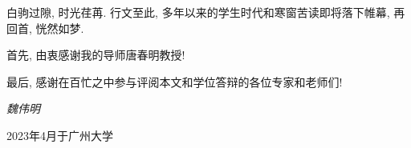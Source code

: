 \begin{thanks}
白驹过隙, 时光荏苒. 行文至此, 多年以来的学生时代和寒窗苦读即将落下帷幕, 再回首, 恍然如梦. 

首先, 由衷感谢我的导师唐春明教授! 

最后, 感谢在百忙之中参与评阅本文和学位答辩的各位专家和老师们! 


\vskip 6pt
\hspace{10.5cm} \textit{魏伟明}

\vskip 6pt
\hspace{9.0cm} 2023年4月于广州大学 
\end{thanks}
